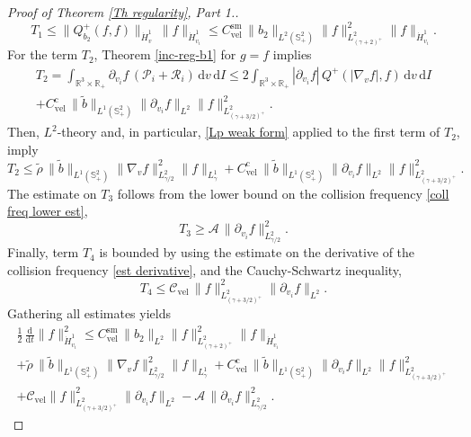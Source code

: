 \documentclass[11pt,a4paper]{amsart}
\newcommand{\bRp}{\mathbb{R}_+}
\newcommand{\bRfp}{\mathbb{R}^3 \times \bRp}
\newcommand{\bSp}{\mathbb{S}^2_+}
\newcommand{\md}{\mathrm{d}}
\newcommand{\g}{\gamma}
\newcommand{\mA}{\mathcal{A}}
\newcommand{\R}{\mathcal{R}}
\newcommand{\Prim}{\mathcal{P}}
\newcommand{\Csvel}{C_{\text{vel}}^{\text{sm}}}
\newcommand{\Clvel}{\mathcal{C}_{\text{vel}}}
\newcommand{\Ccmvel}{C_{\text{vel}}^{\text{c}}}
\begin{document}
\begin{proof}[Proof of Theorem \ref{Th regularity}, Part 1.]
\begin{equation*}
T_1 	\leq   \| Q_{b_2}^+(f,f) \|_{\dot{H}^{1}_{v}}  \ \| f \|_{\dot{H}^{1}_{v_i}} \leq   \Csvel   \, \|b_2\|_{L^{2}(\bSp)}\| f \|_{L^{2}_{(\gamma+2)^+}}^2   \| f \|_{\dot{H}^{1}_{v_i}}.
\end{equation*}
For the term $T_2$, Theorem \ref{inc-reg-b1} for $g=f$ implies
\begin{multline*}
	T_2 = 
	\int_{\bRfp } \partial_{v_i} f  \,\left( \Prim_i  + \R_i \right) \, \md  v \, \md I
	\leq 
	2			\int_{ \bRfp } | \partial_{v_i} f |    \, Q^+\left( \left| \nabla_{v}  f \right|,  f \right) \, \md  v \, \md I 
\\	+  \Ccmvel \, \| \tilde{b} \|_{{L^{1}(\bSp)}}  \|  \partial_{v_i} f  \|_{L^2}
	\| f \|^2_{L^{2}_{(\g+3/2)^+}}.
\end{multline*}
Then, $L^2$-theory \cite{MC-Alonso-Lp} and, in particular,   \eqref{Lp weak form} applied	  to the first term of $T_2$,  imply
\begin{equation*}
	T_2					  		\leq  \tilde{ \rho }\,  	\| \tilde{b} \|_{{L^{1}(\bSp)}}    \| \nabla_v f    \|^2_{L^2_{ {\g}/{2}}}  \|  	f    \|_{L^1_{\g}} 	+  \Ccmvel \, \| \tilde{b} \|_{{L^{1}(\bSp)}}  \|  \partial_{v_i} f  \|_{L^2}
	\| f \|^2_{L^{2}_{(\g+3/2)^+}}.
\end{equation*}
The estimate on $T_3$ follows from the lower bound on the collision frequency \eqref{coll freq lower est},
\begin{equation*}
	T_3 \geq \mA \,  \| \partial_{v_i} f    \|_{{L}^{2}_{\g/2}}^2.
\end{equation*}
Finally, term $T_4$ is  bounded by using the estimate on the derivative of the collision frequency \eqref{est derivative}, and the Cauchy-Schwartz inequality,
\begin{equation*}
	T_4  \leq\Clvel \,	\| f \|^2_{L^{2}_{(\g+3/2)^+}} \|  \partial_{v_i} f \|_{L^2}.
\end{equation*}
Gathering all estimates yields
\begin{multline*}
	\frac{1}{2} \,\frac{\md}{\md t}\| f \|_{\dot{H}^{1}_{v_i}}^2 \leq
	\Csvel \, \|b_2\|_{L^{2}}\| f \|_{L^{2}_{(\gamma+2)^+}}^2   \| f \|_{\dot{H}^{1}_{v_i}}
	\\
	+   \tilde{ \rho }\,  	\| \tilde{b} \|_{{L^{1}(\bSp)}}    \| \nabla_v f    \|^2_{L^2_{ {\g}/{2}}}  \|  	f    \|_{L^1_{\g}} 	+  \Ccmvel \, \| \tilde{b} \|_{{L^{1}(\bSp)}}  \|  \partial_{v_i} f  \|_{L^2}
	\| f \|^2_{L^{2}_{(\g+3/2)^+}}
	\\
+	\Clvel	\| f \|^2_{L^{2}_{(\g+3/2)^+}}   \| \partial_{v_i} f \|_{L^2}
	 -\mA \,  \| \partial_{v_i} f    \|_{{L}^{2}_{\g/2}}^2.

\end{multline*}
\end{proof}
\end{document}
